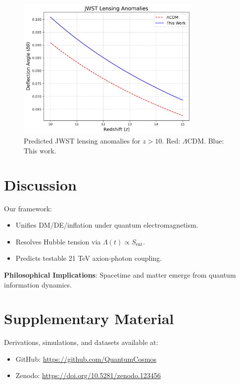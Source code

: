 \documentclass[12pt, a4paper]{article}
\begin{document}
\begin{figure}[t]  
\centering  
\includegraphics[width=0.8\textwidth]{jwst_lensing.png}  
\caption{Predicted JWST lensing anomalies for \( z > 10 \). Red: \(\Lambda\)CDM. Blue: This work.}  
\label{fig:lensing_anomaly}  
\end{figure}  

\section{Discussion}  
\label{sec:discussion}  
Our framework:  
\begin{itemize}  
\item Unifies DM/DE/inflation under quantum electromagnetism.  
\item Resolves Hubble tension via \( \Lambda(t) \propto S_{\text{ent}} \).  
\item Predicts testable 21 TeV axion-photon coupling.  
\end{itemize}  
\textbf{Philosophical Implications}: Spacetime and matter emerge from quantum information dynamics.   

\section*{Supplementary Material}  
Derivations, simulations, and datasets available at:  
\begin{itemize}  
\item GitHub: \url{https://github.com/QuantumCosmos}  
\item Zenodo: \url{https://doi.org/10.5281/zenodo.123456}  
\end{itemize}  

  
  
\end{document}

